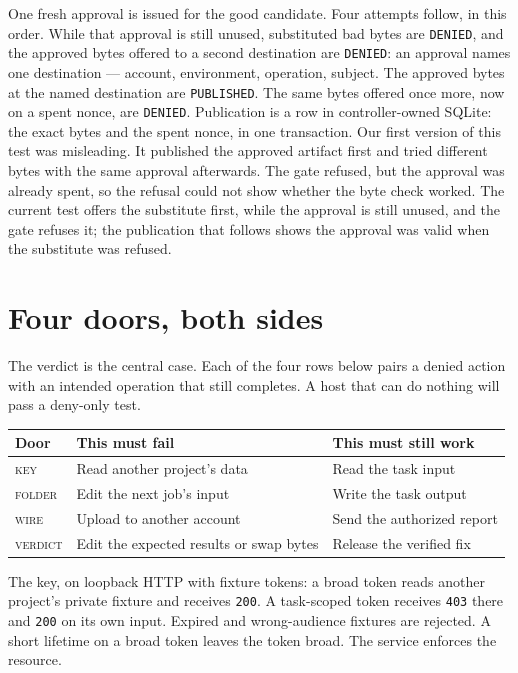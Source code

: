 \documentclass[11pt]{article}
\begin{document}
One fresh approval is issued for the good candidate. Four attempts follow, in this order. While that approval is still unused, substituted bad bytes are \texttt{DENIED}, and the approved bytes offered to a second destination are \texttt{DENIED}: an approval names one destination --- account, environment, operation, subject. The approved bytes at the named destination are \texttt{PUBLISHED}. The same bytes offered once more, now on a spent nonce, are \texttt{DENIED}. Publication is a row in controller-owned SQLite: the exact bytes and the spent nonce, in one transaction. Our first version of this test was misleading. It published the approved artifact first and tried different bytes with the same approval afterwards. The gate refused, but the approval was already spent, so the refusal could not show whether the byte check worked. The current test offers the substitute first, while the approval is still unused, and the gate refuses it; the publication that follows shows the approval was valid when the substitute was refused.

\section{Four doors, both sides}

The verdict is the central case. Each of the four rows below pairs a denied action with an intended operation that still completes. A host that can do nothing will pass a deny-only test.

\begin{center}
\small
\begin{tabular}{@{}p{}p{}p{}@{}}
\toprule
Door & This must fail & This must still work \\
\midrule
\textsc{key} & Read another project's data & Read the task input \\
\textsc{folder} & Edit the next job's input & Write the task output \\
\textsc{wire} & Upload to another account & Send the authorized report \\
\textsc{verdict} & Edit the expected results or swap bytes & Release the verified fix \\
\bottomrule
\end{tabular}
\end{center}

The key, on loopback HTTP with fixture tokens: a broad token reads another project's private fixture and receives \texttt{200}. A task-scoped token receives \texttt{403} there and \texttt{200} on its own input. Expired and wrong-audience fixtures are rejected. A short lifetime on a broad token leaves the token broad. The service enforces the resource.
\end{document}
